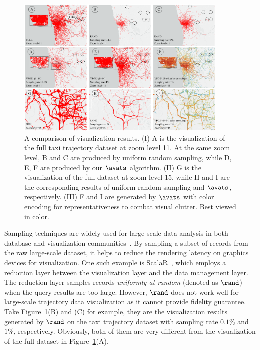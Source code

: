 \begin{figure}[t]
	\centering
	\includegraphics[width=0.90\textwidth]{pictures/Teaser.pdf}
	\vspace{-2mm}
	\caption{A comparison of visualization results. (I) A is the visualization of the full \pt{} taxi trajectory dataset at zoom level 11.
    At the same zoom level, B and C are produced by uniform random sampling,
    while D, E, F are produced by our $\avats$ algorithm.
    (II) G is the visualization of the full \pt{} dataset at zoom level 15, while H and I are the corresponding results of uniform random sampling and $\avats$, respectively.
    (III) F and I are generated by $\avats$ with color encoding for representativeness to combat visual clutter.
    Best viewed in color.}
	\label{fig:teaser}
\trim \trim
\end{figure}

Sampling techniques are widely used for large-scale data analysis in both database and visualization communities~\cite{qin2020making,DBLP:conf/sigmod/DingHCC016,DBLP:journals/pvldb/KimBPIMR15,park2016visualization}. By sampling a subset of records from the raw large-scale dataset, it helps to reduce the rendering latency on graphics devices for visualization. One such example is ScalaR~\cite{battle2013dynamic}, which employs a reduction layer between the visualization layer and the data management layer. The reduction layer samples records \textit{uniformly at random} (denoted as $\rand$) when the query results are too large. However, $\rand$ does not work well for large-scale trajectory data visualization as it cannot provide fidelity guarantee. Take Figure~\ref{fig:teaser}(B) and (C) for example, they are the visualization results generated by $\rand$ on the \pt{} taxi trajectory dataset with sampling rate $0.1\%$ and $1\%$, respectively. Obviously, both of them are very different from the visualization of the full \pt{} dataset in Figure~\ref{fig:teaser}(A).


